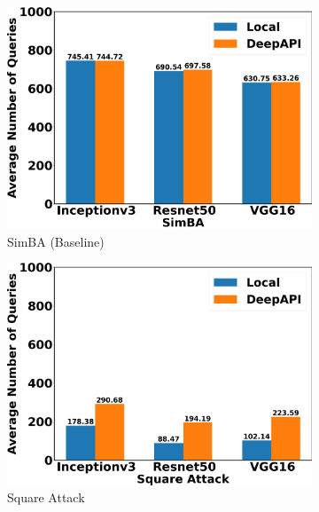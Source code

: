 \begin{figure}[tbp]
\centering
\begin{subfigure}[b]{0.32\textwidth}
    \centering
    \includegraphics[width=\textwidth]{figures/chapter_classification/simba_number_of_queries.png}
    \caption{SimBA (Baseline)}
    \label{fig:simba_queries}
\end{subfigure}
\hfill
\begin{subfigure}[b]{0.32\textwidth}
    \centering
    \includegraphics[width=\textwidth]{figures/chapter_classification/square_number_of_queries.png}
    \caption{Square Attack}
    \label{fig:square_queries}
\end{subfigure}
\hfill
\begin{subfigure}[b]{0.32\textwidth}
    \centering

\end{subfigure}
\end{figure}
